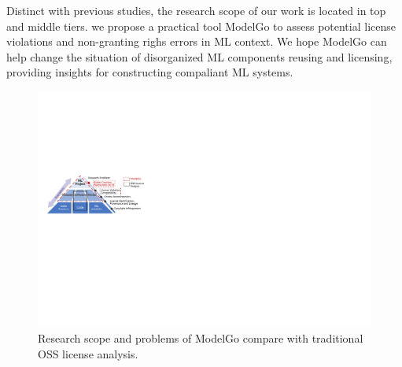 Distinct with previous studies, the research scope of our work is located in top and middle tiers.
we propose a practical tool ModelGo to assess potential license violations and non-granting righs errors in ML context.
We hope ModelGo can help change the situation of disorganized ML components reusing and licensing, providing insights for constructing compaliant ML systems.


\begin{figure}[t]
    \centering
    \includegraphics[width=\linewidth]{fig/pyramid.pdf}
    \caption{Research scope and problems of ModelGo compare with traditional OSS license analysis.}
    \Description{}
    \label{fig:pyramid}
    \vspace{-5mm}
\end{figure}



